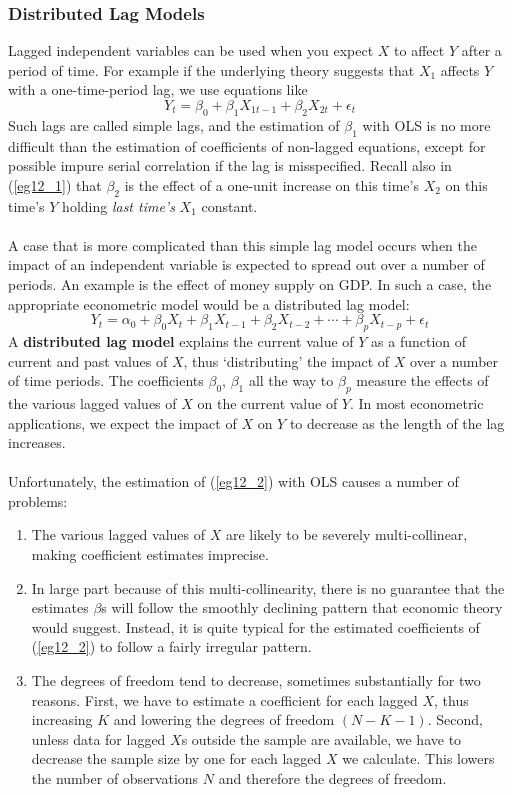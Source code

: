 \documentclass[11pt]{article}
\begin{document}
\subsubsection{Distributed Lag Models}
Lagged independent variables can be used when you expect $X$ to affect $Y$ after a period of time. For example if the underlying theory suggests that $X_1$ affects $Y$ with a one-time-period lag, we use equations like
\begin{equation}
Y_t = \beta_0 + \beta_1X_{1t-1} + \beta_2X_{2t} + \epsilon_t \label{eg12_1}
\end{equation}
Such lags are called simple lags, and the estimation of $\beta_1$ with OLS is no more difficult than the estimation of coefficients of non-lagged equations, except for possible impure serial correlation if the lag is misspecified. Recall also in (\ref{eg12_1}) that $\beta_2$ is the effect of a one-unit increase on this time's $X_2$ on this time's $Y$ holding \textit{last time's} $X_1$ constant.\\ \\
A case that is more complicated than this simple lag model occurs when the impact of an independent variable is expected to spread out over a number of periods. An example is the effect of money supply on GDP. In such a case, the appropriate econometric model would be a distributed lag model:
\begin{equation}
Y_t = \alpha_0 + \beta_0X_t + \beta_1X_{t-1} + \beta_2X_{t-2} + \cdots + \beta_pX_{t-p} + \epsilon_t \label{eg12_2}
\end{equation}
A \textbf{distributed lag model} explains the current value of $Y$ as a function of current and past values of $X$, thus `distributing' the impact of $X$ over a number of time periods. The coefficients $\beta_0$, $\beta_1$ all the way to $\beta_p$ measure the effects of the various lagged values of $X$ on the current value of $Y$. In most econometric  applications, we expect the impact of $X$ on $Y$ to decrease as the length of the lag increases.\\ \\
Unfortunately, the estimation of (\ref{eg12_2}) with OLS causes a number of problems:
\begin{enumerate}
\item The various lagged values of $X$ are likely to be severely multi-collinear, making coefficient estimates imprecise.
\item In large part because of this multi-collinearity, there is no guarantee that the estimates $\beta$s will follow the smoothly declining pattern that economic theory would suggest. Instead, it is quite typical for the estimated coefficients of (\ref{eg12_2}) to follow a fairly irregular pattern.
\item The degrees of freedom tend to decrease, sometimes substantially for two reasons. First, we have to estimate a coefficient for each lagged $X$, thus increasing $K$ and lowering the degrees of freedom $(N-K-1)$. Second, unless data for lagged $X$s outside the sample are available, we have to decrease the sample size by one for each lagged $X$ we calculate. This lowers the number of observations $N$ and therefore the degrees of freedom.
\end{enumerate}
\end{document}
